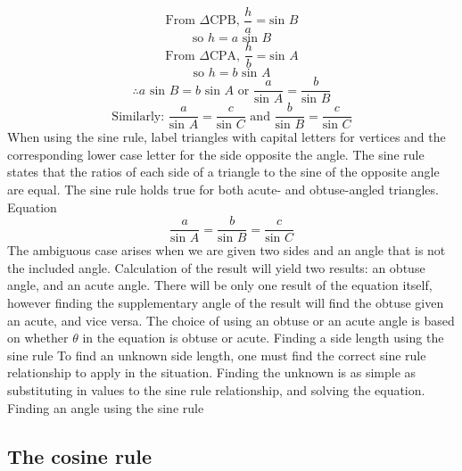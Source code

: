 \begin{outline}
\begin{center}
\end{center}
		\[\text{From }\Delta \text{CPB} \text{, } \frac{h}{a} = \text{sin } B\]
		\[\text{so\ \ \ \ \ \ \ \ } h = a \text{ sin } B\]
		\[\text{From }\Delta \text{CPA} \text{, } \frac{h}{b} = \text{sin } A\]
		\[\text{so\ \ \ \ \ \ \ \ } h = b \text{ sin } A\]
		\[\therefore a \text{ sin } B = b \text{ sin } A \text{\ \ or\ \ } \frac{a}{\text{sin } A} = \frac{b}{\text{sin } B}\]
		\[\text{Similarly:\ \ } \frac{a}{\text{sin } A} = \frac{c}{\text{sin } C} \text{\ \ and\ \ } \frac{b}{\text{sin } B} = \frac{c}{\text{sin } C}\]
		\2 When using the sine rule, label triangles with capital letters for vertices and the corresponding lower case letter for the side opposite the angle.
		\2 The sine rule states that the ratios of each side of a triangle to the sine of the opposite angle are equal. The sine rule holds true for both acute- and obtuse-angled triangles.
			\3 Equation
				\[\frac{a}{\text{sin } A} = \frac{b}{\text{sin } B} = \frac{c}{\text{sin } C}\]
		\2 The ambiguous case arises when we are given two sides and an angle that is not the included angle. Calculation of the result will yield two results: an obtuse angle, and an acute angle. There will be only one result of the equation itself, however finding the supplementary angle of the result will find the obtuse given an acute, and vice versa. The choice of using an obtuse or an acute angle is based on whether $\theta$ in the equation is obtuse or acute.
	\1 Finding a side length using the sine rule
		\2 To find an unknown side length, one must find the correct sine rule relationship to apply in the situation. Finding the unknown is as simple as substituting in values to the sine rule relationship, and solving the equation.
	\1 Finding an angle using the sine rule
		\2 

\0
\subsection{The cosine rule}


\end{outline}
